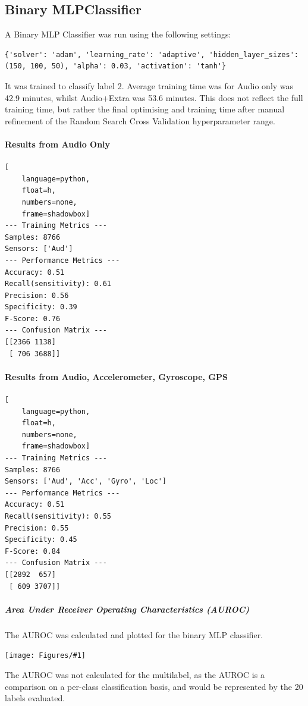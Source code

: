 \documentclass{UoNMCHA}
\newcommand{\fFigure}[3]{
        \begin{center}  
            \texttt{[image: Figures/\#1]}  
        \captionof{figure}{#2}
            \label{#1}
        \end{center}
}
\numberwithin{equation}{section}
\begin{document}
\subsection{Binary MLPClassifier}

A Binary MLP Classifier was run using the following settings:
\begin{lstlisting}[breaklines=true]
    {'solver': 'adam', 'learning_rate': 'adaptive', 'hidden_layer_sizes': (150, 100, 50), 'alpha': 0.03, 'activation': 'tanh'}
\end{lstlisting}
It was trained to classify label 2. Average training time was for Audio only was 42.9 minutes, whilst Audio+Extra was 53.6 minutes. This does not reflect the full training time, but rather the final optimising and training time after manual refinement of the Random Search Cross Validation hyperparameter range.

\paragraph{Results from Audio Only}
\begin{lstlisting}[
    language=python,
    float=h,
    numbers=none,
    frame=shadowbox]
--- Training Metrics ---
Samples: 8766
Sensors: ['Aud']
--- Performance Metrics ---
Accuracy: 0.51
Recall(sensitivity): 0.61
Precision: 0.56
Specificity: 0.39
F-Score: 0.76
--- Confusion Matrix ---
[[2366 1138]
 [ 706 3688]]
\end{lstlisting}

\paragraph{Results from Audio, Accelerometer, Gyroscope, GPS}

\begin{lstlisting}[
    language=python,
    float=h,
    numbers=none,
    frame=shadowbox]
--- Training Metrics ---
Samples: 8766
Sensors: ['Aud', 'Acc', 'Gyro', 'Loc']
--- Performance Metrics ---
Accuracy: 0.51
Recall(sensitivity): 0.55
Precision: 0.55
Specificity: 0.45
F-Score: 0.84
--- Confusion Matrix ---
[[2892  657]
 [ 609 3707]]
\end{lstlisting}

\subparagraph{Area Under Receiver Operating Characteristics (AUROC)}
The AUROC was calculated and plotted for the binary MLP classifier.
\fFigure{both_ROC.png}{ROCs for Audio, Audio+Extra}{1}

The AUROC was not calculated for the multilabel, as the AUROC is a comparison on a per-class classification basis, and would be represented by the 20 labels evaluated.
\end{document}
